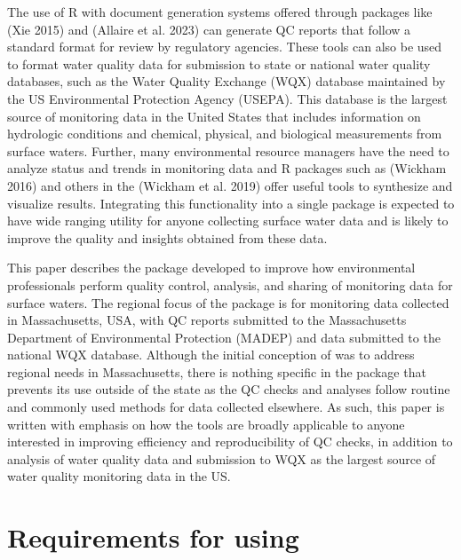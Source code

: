 The use of R with document generation systems offered through packages like  (Xie 2015) and  (Allaire et al. 2023) can generate QC reports that follow a standard format for review by regulatory agencies. These tools can also be used to format water quality data for submission to state or national water quality databases, such as the Water Quality Exchange (WQX) database maintained by the US Environmental Protection Agency (USEPA). This database is the largest source of monitoring data in the United States that includes information on hydrologic conditions and chemical, physical, and biological measurements from surface waters. Further, many environmental resource managers have the need to analyze status and trends in monitoring data and R packages such as  (Wickham 2016) and others in the  (Wickham et al. 2019) offer useful tools to synthesize and visualize results. Integrating this functionality into a single package is expected to have wide ranging utility for anyone collecting surface water data and is likely to improve the quality and insights obtained from these data.

This paper describes the  package developed to improve how environmental professionals perform quality control, analysis, and sharing of monitoring data for surface waters. The regional focus of the package is for monitoring data collected in Massachusetts, USA, with QC reports submitted to the Massachusetts Department of Environmental Protection (MADEP) and data submitted to the national WQX database. Although the initial conception of  was to address regional needs in Massachusetts, there is nothing specific in the package that prevents its use outside of the state as the QC checks and analyses follow routine and commonly used methods for data collected elsewhere. As such, this paper is written with emphasis on how the tools are broadly applicable to anyone interested in improving efficiency and reproducibility of QC checks, in addition to analysis of water quality data and submission to WQX as the largest source of water quality monitoring data in the US.

\hypertarget{requirements-for-using}{%
\section{\texorpdfstring{Requirements for using }{Requirements for using }}\label{requirements-for-using}}

